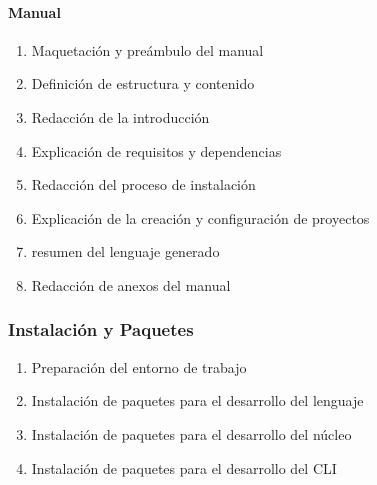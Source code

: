 \paragraph{Manual}
\begin{enumerate}
    \item Maquetación y preámbulo del manual
    \item Definición de estructura y contenido
    \item Redacción de la introducción
    \item Explicación de requisitos y dependencias
    \item Redacción del proceso de instalación
    \item Explicación de la creación y configuración de proyectos
    \item resumen del lenguaje generado
    \item Redacción de anexos del manual
\end{enumerate}

\subsubsection{Instalación y Paquetes}
\begin{enumerate}
    \item Preparación del entorno de trabajo
    \item Instalación de paquetes para el desarrollo del lenguaje
    \item Instalación de paquetes para el desarrollo del núcleo
    \item Instalación de paquetes para el desarrollo del CLI
\end{enumerate}












